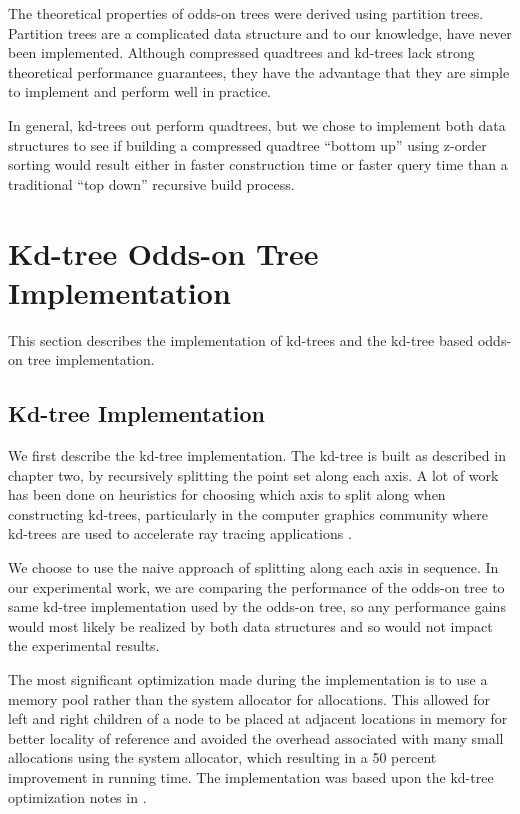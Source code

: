 \documentclass[mcs]{scsthesis}
\begin{document}
The theoretical properties of odds-on trees were derived using partition trees.
Partition trees are a complicated data structure and to our knowledge, have
never been implemented. Although compressed quadtrees and kd-trees lack strong
theoretical performance guarantees, they have the advantage that they are
simple to implement and perform well in practice.

In general, kd-trees out perform quadtrees, but we chose to implement both data
structures to see if building a compressed quadtree ``bottom up'' using z-order
sorting would result either in faster construction time or faster query time
than a traditional ``top down'' recursive build process.

\section{Kd-tree Odds-on Tree Implementation}

This section describes the implementation of kd-trees and the kd-tree based
odds-on tree implementation.

\subsection{Kd-tree Implementation}

We first describe the kd-tree implementation. The kd-tree is built as described
in chapter two, by recursively splitting the point set along each axis.  A lot
of work has been done on heuristics for choosing which axis to split along when
constructing kd-trees, particularly in the computer graphics community where
kd-trees are used to accelerate ray tracing applications
\cite{physicallybasedrendering}.

We choose to use the naive approach of splitting along each axis in sequence.
In our experimental work, we are comparing the performance of the odds-on tree
to same kd-tree implementation used by the odds-on tree, so any performance
gains would most likely be realized by both data structures and so would not
impact the experimental results.

The most significant optimization made during the implementation is to use
a memory pool rather than the system allocator for allocations. This allowed
for left and right children of a node to be placed at adjacent locations in
memory for better locality of reference and avoided the overhead associated
with many small allocations using the system allocator, which resulting in a
50 percent improvement in running time. The implementation was based upon the
kd-tree optimization notes in \cite{physicallybasedrendering}.
\end{document}
